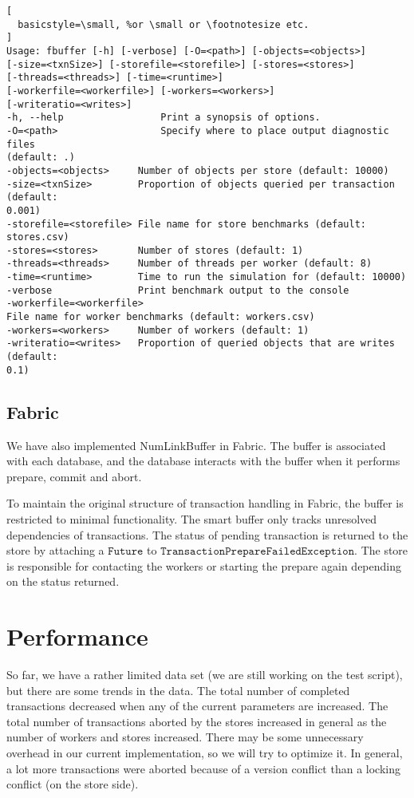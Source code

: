 \documentclass{article}
\begin{document}
\begin{lstlisting}[
  basicstyle=\small, %or \small or \footnotesize etc.
]
Usage: fbuffer [-h] [-verbose] [-O=<path>] [-objects=<objects>]
[-size=<txnSize>] [-storefile=<storefile>] [-stores=<stores>]
[-threads=<threads>] [-time=<runtime>]
[-workerfile=<workerfile>] [-workers=<workers>]
[-writeratio=<writes>]
-h, --help                 Print a synopsis of options.
-O=<path>                  Specify where to place output diagnostic files
(default: .)
-objects=<objects>     Number of objects per store (default: 10000)
-size=<txnSize>        Proportion of objects queried per transaction (default:
0.001)
-storefile=<storefile> File name for store benchmarks (default: stores.csv)
-stores=<stores>       Number of stores (default: 1)
-threads=<threads>     Number of threads per worker (default: 8)
-time=<runtime>        Time to run the simulation for (default: 10000)
-verbose               Print benchmark output to the console
-workerfile=<workerfile>
File name for worker benchmarks (default: workers.csv)
-workers=<workers>     Number of workers (default: 1)
-writeratio=<writes>   Proportion of queried objects that are writes (default:
0.1)
\end{lstlisting}


\subsection{Fabric}
We have also implemented NumLinkBuffer in Fabric. The buffer is associated with
each database, and the database interacts with the buffer when it performs
prepare, commit and abort.

To maintain the original structure of transaction handling in Fabric, the buffer
is restricted to minimal functionality. The smart buffer only tracks unresolved
dependencies of transactions. The status of pending transaction is returned to
the store by attaching a $\mathtt{Future}$ to
$\mathtt{TransactionPrepareFailedException}$. The store is responsible for
contacting the workers or starting the prepare again depending on the status
returned.

\section{Performance}
\label{sec:performance}

So far, we have a rather limited data set (we are still working on the test
script), but there are some trends in the data. The total number of completed
transactions decreased when any of the current parameters are increased. The
total number of transactions aborted by the stores increased in general as the
number of workers and stores increased. There may be some unnecessary overhead
in our current implementation, so we will try to optimize it. In general, a lot
more transactions were aborted because of a version conflict than a locking
conflict (on the store side).
\end{document}
